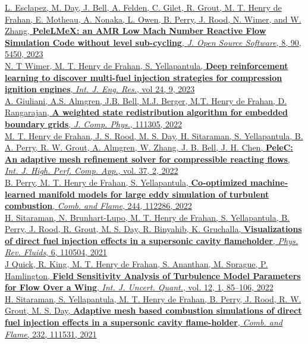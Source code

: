 \documentclass[11pt,letterpaper]{article}
\begin{document}
\href{https://doi.org/10.21105/joss.05450}{L. Esclapez, M. Day, J. Bell, A. Felden, C. Gilet, R. Grout, M. T. Henry de Frahan, E. Motheau, A. Nonaka, L. Owen, B. Perry, J. Rood, N. Wimer, and W. Zhang, \textbf{PeleLMeX: an AMR Low Mach Number Reactive Flow Simulation Code without level sub-cycling}, \textit{J. Open Source Software}, 8, 90, 5450, 2023}\\[2ex]
\href{https://doi.org/10.1177/1468087423118400}{N. T Wimer, M. T. Henry de Frahan, S. Yellapantula, \textbf{Deep reinforcement learning to discover multi-fuel injection strategies for compression ignition engines}, \textit{Int. J. Eng. Res.}, vol 24, 9, 2023}\\[2ex]
\href{https://doi.org/10.1103/PhysRevFluids.6.110504}{A. Giuliani, A.S. Almgren, J.B. Bell, M.J. Berger, M.T. Henry de Frahan, D. Rangarajan, \textbf{A weighted state redistribution algorithm for embedded boundary grids}, \textit{J. Comp. Phys.}, 111305, 2022}\\[2ex]
\href{https://doi.org/10.1177/10943420221121151}{M. T. Henry de Frahan, J. S. Rood, M. S. Day, H. Sitaraman, S. Yellapantula, B. A. Perry, R. W. Grout, A. Almgren, W. Zhang, J. B. Bell, J. H. Chen, \textbf{PeleC: An adaptive mesh refinement solver for compressible reacting flows}, \textit{Int. J. High. Perf. Comp. App.}, vol. 37, 2, 2022}\\[2ex]
\href{https://doi.org/10.1016/j.combustflame.2022.112286}{B. Perry, M. T. Henry de Frahan, S. Yellapantula, \textbf{Co-optimized machine-learned manifold models for large eddy simulation of turbulent combustion}, \textit{Comb. and Flame}, 244, 112286, 2022}\\[2ex]
\href{https://doi.org/10.1103/PhysRevFluids.6.110504}{H. Sitaraman, N. Brunhart-Lupo, M. T. Henry de Frahan, S. Yellapantula, B. Perry, J. Rood, R. Grout, M. S. Day, R. Binyahib, K. Gruchalla, \textbf{Visualizations of direct fuel injection effects in a supersonic cavity flameholder}, \textit{Phys. Rev. Fluids}, 6, 110504, 2021}\\[2ex]
\href{https://doi.org/10.1615/Int.J.UncertaintyQuantification.2021036467 }{J Quick, R. King, M. T. Henry de Frahan, S. Ananthan, M. Sprague, P. Hamlington, \textbf{Field Sensitivity Analysis of Turbulence Model Parameters for Flow Over a Wing}, \textit{Int. J. Uncert. Quant.}, vol. 12, 1, 85--106, 2022}\\[2ex]
\href{https://doi.org/10.1016/j.combustflame.2021.111531}{H. Sitaraman, S. Yellapantula, M. T. Henry de Frahan, B. Perry, J. Rood, R. W. Grout, M. S. Day, \textbf{Adaptive mesh based combustion simulations of direct fuel injection effects in a supersonic cavity flame-holder}, \textit{Comb. and Flame}, 232, 111531, 2021}\\[2ex]
\end{document}
